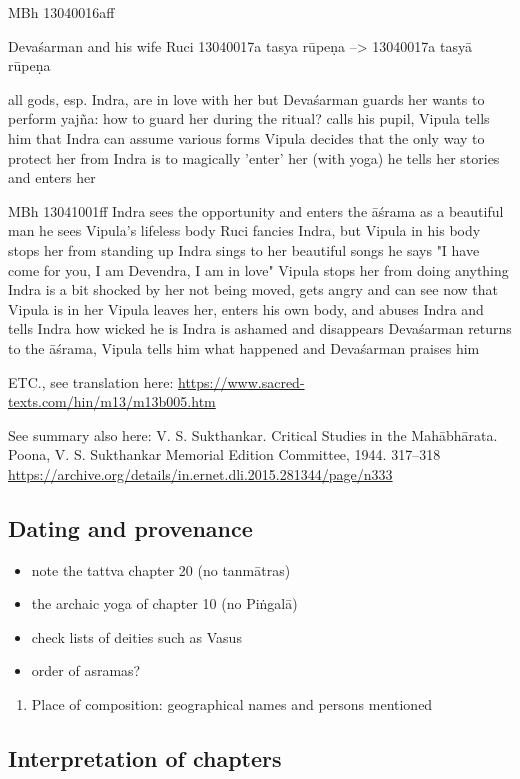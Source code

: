 \documentclass[11pt]{article}
\begin{document}
MBh 13040016aff

Devaśarman and his wife Ruci
13040017a tasya rūpeṇa --> 13040017a tasyā rūpeṇa

all gods, esp. Indra, are in love with her
but Devaśarman guards her
wants to perform yajña: how to guard her during the ritual?
calls his pupil, Vipula
tells him that Indra can assume various forms
Vipula decides that the only way to protect her from Indra is to magically 'enter' her (with yoga)
he tells her stories and enters her 

MBh 13041001ff
Indra sees the opportunity and enters the āśrama as a beautiful man
he sees Vipula's lifeless body
Ruci fancies Indra, but Vipula in his body stops her from standing up
Indra sings to her beautiful songs
he says "I have come for you, I am Devendra, I am in love"
Vipula stops her from doing anything
Indra is a bit shocked by her not being moved, gets angry and can see now that Vipula is in her
Vipula leaves her, enters his own body, and abuses Indra and tells Indra how wicked he is
Indra is ashamed and disappears
Devaśarman returns to the āśrama, Vipula tells him what happened and Devaśarman praises him

ETC., see translation here:
\url{https://www.sacred-texts.com/hin/m13/m13b005.htm}

See summary also here:
V. S. Sukthankar. Critical Studies in the Mahābhārata.
	Poona, V. S. Sukthankar Memorial Edition Committee, 1944. 317--318
\url{https://archive.org/details/in.ernet.dli.2015.281344/page/n333}

\subsection{Dating and provenance}
\label{sec:org06fa85b}
\begin{itemize}
\item note the tattva chapter 20 (no tanmātras)
\item the archaic yoga of chapter 10 (no Piṅgalā)
\item check lists of deities such as Vasus
\item order of asramas?
\end{itemize}
\begin{enumerate}
\item Place of composition: geographical names and persons mentioned
\label{sec:org8e5e470}
\end{enumerate}

\subsection{Interpretation of chapters}
\label{sec:org93b9b29}
\end{document}
